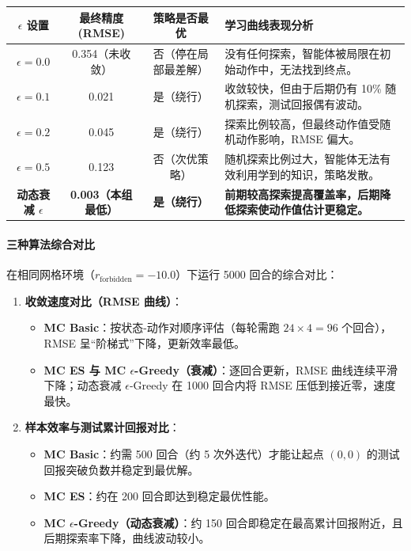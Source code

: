 \documentclass[11pt,a4paper,UTF8]{ctexart}
\numberwithin{figure}{section}
\numberwithin{table}{section}
\begin{document}
\begin{table}[H]
\centering
\begin{tabular}{cccC{5.2cm}}
\toprule
$\epsilon$ 设置 & 最终精度 (RMSE) & 策略是否最优 & 学习曲线表现分析 \\
\midrule
\textbf{$\epsilon = 0.0$} & 0.354（未收敛） & 否（停在局部最差解） & 没有任何探索，智能体被局限在初始动作中，无法找到终点。 \\
\textbf{$\epsilon = 0.1$} & 0.021 & 是（绕行） & 收敛较快，但由于后期仍有 10\% 随机探索，测试回报偶有波动。 \\
\textbf{$\epsilon = 0.2$} & 0.045 & 是（绕行） & 探索比例较高，但最终动作值受随机动作影响，RMSE 偏大。 \\
\textbf{$\epsilon = 0.5$} & 0.123 & 否（次优策略） & 随机探索比例过大，智能体无法有效利用学到的知识，策略发散。 \\
\textbf{动态衰减 $\epsilon$} & \textbf{0.003（本组最低）} & \textbf{是（绕行）} & \textbf{前期较高探索提高覆盖率，后期降低探索使动作值估计更稳定。} \\
\bottomrule
\end{tabular}
\end{table}

\paragraph{三种算法综合对比}

在相同网格环境（$r_\text{forbidden} = -10.0$）下运行 5000 回合的综合对比：
\begin{enumerate}
\item \textbf{收敛速度对比（RMSE 曲线）}：
  \begin{itemize}
  \item \textbf{MC Basic}：按状态-动作对顺序评估（每轮需跑 $24 \times 4 = 96$ 个回合），RMSE 呈``阶梯式''下降，更新效率最低。
  \item \textbf{MC ES 与 MC $\epsilon$-Greedy（衰减）}：逐回合更新，RMSE 曲线连续平滑下降；动态衰减 $\epsilon$-Greedy 在 1000 回合内将 RMSE 压低到接近零，速度最快。
  \end{itemize}
\item \textbf{样本效率与测试累计回报对比}：
  \begin{itemize}
  \item \textbf{MC Basic}：约需 500 回合（约 5 次外迭代）才能让起点 $(0,0)$ 的测试回报突破负数并稳定到最优解。
  \item \textbf{MC ES}：约在 200 回合即达到稳定最优性能。
  \item \textbf{MC $\epsilon$-Greedy（动态衰减）}：约 150 回合即稳定在最高累计回报附近，且后期探索率下降，曲线波动较小。
  \end{itemize}
\end{enumerate}
\end{document}
